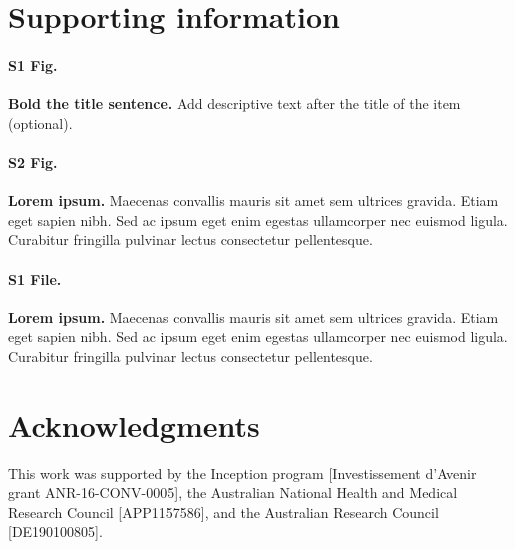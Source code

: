 \documentclass[10pt,letterpaper]{article}
\begin{document}
\section*{Supporting information}

\paragraph*{S1 Fig.}
\label{S1_Fig}
{\bf Bold the title sentence.} Add descriptive text after the title of the item (optional).

\paragraph*{S2 Fig.}
\label{S2_Fig}
{\bf Lorem ipsum.} Maecenas convallis mauris sit amet sem ultrices gravida. Etiam eget sapien nibh. Sed ac ipsum eget enim egestas ullamcorper nec euismod ligula. Curabitur fringilla pulvinar lectus consectetur pellentesque.

\paragraph*{S1 File.}
\label{file:S1_File}
{\bf Lorem ipsum.}  Maecenas convallis mauris sit amet sem ultrices gravida. Etiam eget sapien nibh. Sed ac ipsum eget enim egestas ullamcorper nec euismod ligula. Curabitur fringilla pulvinar lectus consectetur pellentesque.

\section*{Acknowledgments}
This work was supported by the Inception program [Investissement d’Avenir grant ANR-16-CONV-0005], the Australian National Health and Medical Research Council [APP1157586], and the Australian Research Council [DE190100805].

\nolinenumbers

%
%
% 

\end{document}
